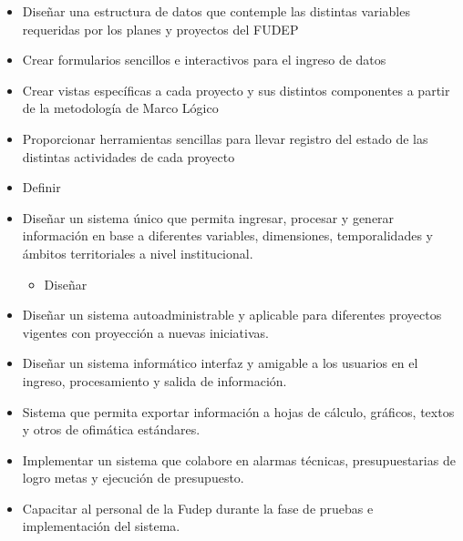 \begin{itemize}
        \item Diseñar una estructura de datos que contemple las distintas variables requeridas por los planes y proyectos del FUDEP
        \item Crear formularios sencillos e interactivos para el ingreso de datos
        \item Crear vistas específicas a cada proyecto y sus distintos componentes a partir de la metodología de Marco Lógico
        \item Proporcionar herramientas sencillas para llevar registro del estado de las distintas actividades de cada proyecto
        \item Definir 
    \item Diseñar un sistema único que permita ingresar, procesar y generar información en base a diferentes variables, dimensiones, temporalidades y ámbitos territoriales a nivel institucional.
        \begin{itemize}
            \item Diseñar 
        \end{itemize}
    \item Diseñar un sistema autoadministrable y aplicable para diferentes proyectos vigentes con proyección a nuevas iniciativas.
    \item Diseñar un sistema informático interfaz y amigable a los usuarios en el ingreso, procesamiento y salida de información.
    \item Sistema que permita exportar información a hojas de cálculo, gráficos, textos y otros de ofimática estándares.
    \item Implementar un sistema que colabore en alarmas técnicas, presupuestarias de logro metas y ejecución de presupuesto.
    \item Capacitar al personal de la Fudep durante la fase de pruebas e implementación del sistema.
\end{itemize}